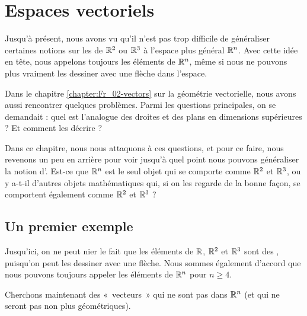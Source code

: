 \chapter{Espaces vectoriels}
\label{chapter:Fr_04-vectorspaces}

Jusqu'à présent, nous avons vu qu'il n'est pas trop difficile de généraliser
certaines notions sur les  de $\mathbb{R}^2$ ou $\mathbb{R}^3$ à l'espace plus général $\mathbb{R}^n$.
Avec cette idée en tête, nous appelons toujours  les éléments de $\mathbb{R}^n$, même si nous ne pouvons plus vraiment
les dessiner avec une flèche dans l'espace.  

Dans le chapitre \ref{chapter:Fr_02-vectors} sur la géométrie vectorielle, nous avons aussi rencontrer quelques problèmes. Parmi les questions principales, on se demandait : quel est 
l'analogue des droites et des plans en dimensions supérieures ? Et comment les décrire ?

Dans ce chapitre, nous nous attaquons à ces questions, et pour ce faire, nous revenons un peu en arrière pour voir jusqu'à quel point
nous pouvons généraliser la notion d'. 
Est-ce que $\mathbb{R}^n$ est le seul objet qui se comporte comme $\mathbb{R}^2$ et $\mathbb{R}^3$, ou y a-t-il d'autres objets mathématiques
qui, si on les regarde de la bonne façon, se comportent également comme $\mathbb{R}^2$ et $\mathbb{R}^3$ ?

\section{Un premier exemple}
Jusqu'ici, on ne peut nier le fait que les éléments de $\mathbb{R}$, $\mathbb{R}^2$ et $\mathbb{R}^3$ sont des 
, puisqu'on peut les dessiner avec une flèche.
Nous sommes également d'accord que nous pouvons toujours appeler  les éléments de $\mathbb{R}^n$ pour $n \geq 4$.

Cherchons maintenant des «~vecteurs~» qui ne sont pas dans $\mathbb{R}^n$ (et qui ne seront pas non plus géométriques).


